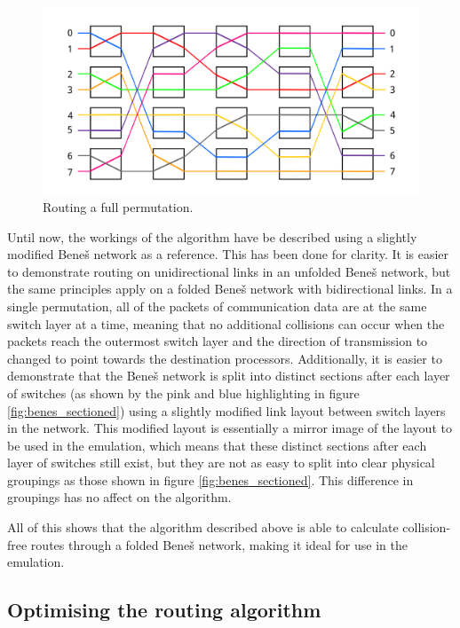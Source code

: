 \documentclass[a4paper, 12pt]{article}
\begin{document}
\begin{figure}[H]
\centering
\includegraphics[width=\textwidth]{benes_full_perm.png}
\caption[Routing a full permutation]{Routing a full permutation.}
\label{fig:benes_full_perm}
\end{figure}

Until now, the workings of the algorithm have be described using a slightly modified Bene\v{s} network as a reference. This has been done for clarity. It is easier to demonstrate routing on unidirectional links in an unfolded Bene\v{s} network, but the same principles apply on a folded Bene\v{s} network with bidirectional links. In a single permutation, all of the packets of communication data are at the same switch layer at a time, meaning that no additional collisions can occur when the packets reach the outermost switch layer and the direction of transmission to changed to point towards the destination processors. Additionally, it is easier to demonstrate that the Bene\v{s} network is split into distinct sections after each layer of switches (as shown by the pink and blue highlighting in figure \ref{fig:benes_sectioned}) using a slightly modified link layout between switch layers in the network. This modified layout is essentially a mirror image of the layout to be used in the emulation, which means that these distinct sections after each layer of switches still exist, but they are not as easy to split into clear physical groupings as those shown in figure \ref{fig:benes_sectioned}. This difference in groupings has no affect on the algorithm.

All of this shows that the algorithm described above is able to calculate collision-free routes through a folded Bene\v{s} network, making it ideal for use in the emulation.

\subsection{Optimising the routing algorithm}
\label{sec:routing_optimisation}
\end{document}
